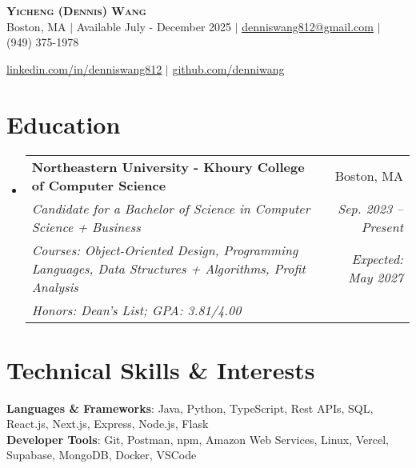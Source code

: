 \documentclass[letterpaper,11pt]{article}
\makeatletter
\newcommand{\eduSubheading}[7]{
  \vspace{-2pt}\item
    \begin{tabular*}{0.97\textwidth}[t]{l@{\extracolsep{\fill}}r}
      \textbf{#1} & #2 \\
      \vspace{-2pt}
      \textit{\small#3} & \hspace{-10cm}\textit{\small #4} \\
      \vspace{-2pt}
      \textit{\footnotesize#5}&\textit{\small #6} \\
      
      \textit{\footnotesize#7}
    \end{tabular*}\vspace{-6pt}
}
\newcommand{\resumeSubHeadingListStart}{\begin{itemize}[leftmargin=0.15in, label={}]}
\newcommand{\resumeSubHeadingListEnd}{\end{itemize}}
\makeatother
\begin{document}

\begin{center}
\textbf{\Huge \scshape Yicheng (Dennis) Wang} \\ \vspace{1pt}
\small Boston, MA  $|$ Available July - December 2025 $|$ \href{mailto:denniswang812@gmail.com}{\underline{denniswang812@gmail.com}} $|$ (949) 375-1978 

\href{https://www.linkedin.com/in/denniswang812/}{\underline{linkedin.com/in/denniswang812}} $|$ \href{https://github.com/denniwang}{\underline{github.com/denniwang}} 
\end{center} 


\section{Education}
  \resumeSubHeadingListStart
    \eduSubheading
      {Northeastern University - Khoury College of Computer Science}{Boston, MA}
      {Candidate for a Bachelor of Science in Computer Science + Business} {Sep. 2023 -- Present}
       {Courses: Object-Oriented Design, Programming Languages, Data Structures + Algorithms, Profit Analysis}{Expected: May 2027}
       {Honors: Dean's List; GPA: 3.81/4.00}
  \resumeSubHeadingListEnd


\section{Technical Skills \& Interests}
 \begin{itemize}[leftmargin=0.15in, label={}]
    \small{\item{
     \textbf{Languages \& Frameworks}{: Java, Python, TypeScript, Rest APIs, SQL, React.js, Next.js, Express, Node.js, Flask} \\
     \textbf{Developer Tools}{: Git, Postman, npm, Amazon Web Services, Linux, Vercel, Supabase, MongoDB, Docker, VSCode} \\

     \vspace{-5pt}
    }}
    
 \end{itemize}

\end{document}
